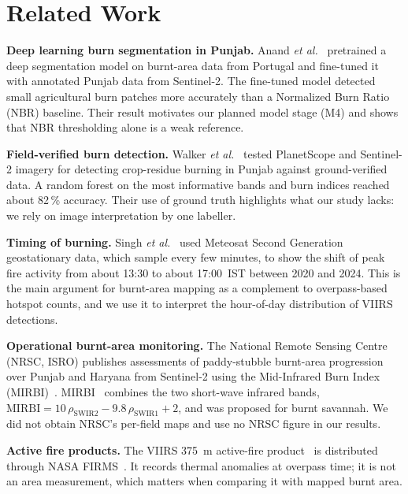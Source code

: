 \documentclass[conference]{IEEEtran}
\begin{document}
\section{Related Work}
\textbf{Deep learning burn segmentation in Punjab.} Anand \emph{et al.}~\cite{anand2025}
pretrained a deep segmentation model on burnt-area data from Portugal and fine-tuned it with
annotated Punjab data from Sentinel-2. The fine-tuned model detected small agricultural burn
patches more accurately than a Normalized Burn Ratio (NBR) baseline. Their result motivates our
planned model stage (M4) and shows that NBR thresholding alone is a weak reference.

\textbf{Field-verified burn detection.} Walker \emph{et al.}~\cite{walker2022} tested
PlanetScope and Sentinel-2 imagery for detecting crop-residue burning in Punjab against
ground-verified data. A random forest on the most informative bands and burn indices reached
about 82\,\% accuracy. Their use of ground truth highlights what our study lacks: we rely on
image interpretation by one labeller.

\textbf{Timing of burning.} Singh \emph{et al.}~\cite{singh2025} used Meteosat Second Generation
geostationary data, which sample every few minutes, to show the shift of peak fire activity from
about 13:30 to about 17:00~IST between 2020 and 2024. This is the main argument for burnt-area
mapping as a complement to overpass-based hotspot counts, and we use it to interpret the hour-of-day
distribution of VIIRS detections.

\textbf{Operational burnt-area monitoring.} The National Remote Sensing Centre (NRSC, ISRO)
publishes assessments of paddy-stubble burnt-area progression over Punjab and Haryana from
Sentinel-2 using the Mid-Infrared Burn Index (MIRBI)~\cite{nrsc2023}.
MIRBI~\cite{trigg2001} combines the two short-wave infrared bands,
$\mathrm{MIRBI}=10\,\rho_{\mathrm{SWIR2}}-9.8\,\rho_{\mathrm{SWIR1}}+2$, and was proposed for
burnt savannah. We did not obtain NRSC's per-field maps and use no NRSC figure in our results.

\textbf{Active fire products.} The VIIRS 375~m active-fire product~\cite{schroeder2014} is
distributed through NASA FIRMS~\cite{firms}. It records thermal anomalies at overpass time; it
is not an area measurement, which matters when comparing it with mapped burnt area.

\end{document}
